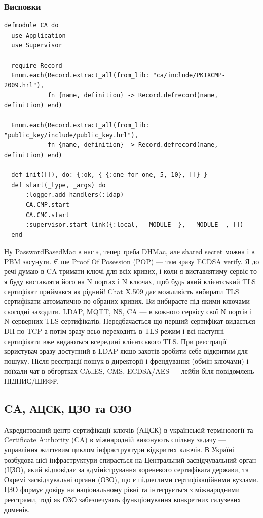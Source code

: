 \newpage
\subsubsection{Висновки}

\begin{lstlisting}
defmodule CA do
  use Application
  use Supervisor

  require Record
  Enum.each(Record.extract_all(from_lib: "ca/include/PKIXCMP-2009.hrl"),
            fn {name, definition} -> Record.defrecord(name, definition) end)

  Enum.each(Record.extract_all(from_lib: "public_key/include/public_key.hrl"),
            fn {name, definition} -> Record.defrecord(name, definition) end)

  def init([]), do: {:ok, { {:one_for_one, 5, 10}, []} }
  def start(_type, _args) do
      :logger.add_handlers(:ldap)
      CA.CMP.start
      CA.CMC.start
      :supervisor.start_link({:local, __MODULE__}, __MODULE__, [])
  end
\end{lstlisting}

Ну PasswordBasedMac в нас є, тепер треба DHMac, але shared secret можна і в PBM засунути. Є ше Proof Of Posession (POP) — там зразу ECDSA verify. Я до речі думаю в CA тримати ключі для всіх кривих, і коли я виставлятиму сервіс то я буду виставляти його на N портах і N ключах, щоб будь який клієнтський TLS сертифікат приймався як рідний! Chat X.509 дає можливість вибирати TLS сертифікати автоматично по обраних кривих. Ви вибираєте під якими ключами сьогодні заходити. LDAP, MQTT, NS, CA — в кожного сервісу свої N портів і N серверних TLS сертифікатів. Передбачається що перший сертифікат видається DH по TCP а потім зразу всьо переходить в TLS режим і всі наступні сертифікати вже видаються всередині клієнтського TLS. При реєстрації користувач зразу доступний в LDAP якшо захотів зробити себе відкритим для пошуку. Після реєстрації пошук в директорії і френдування (обмін ключами) і поїхали чат в обгортках CAdES, CMS, ECDSA/AES — лейби біля повідомлень ПІДПИС/ШИФР.

\subsection{CA, АЦСК, ЦЗО та ОЗО}

Акредитований центр сертифікації ключів (АЦСК) в українській термінології та Certificate Authority (CA) в міжнародній виконують спільну задачу — управління життєвим циклом інфраструктури відкритих ключів. В Україні розбудова цієї інфраструктури спирається на Центральний засвідчувальний орган (ЦЗО), який відповідає за адміністрування кореневого сертифіката держави, та Окремі засвідчувальні органи (ОЗО), що є підлеглими сертифікаційними вузлами. ЦЗО формує довіру на національному рівні та інтегрується з міжнародними реєстрами, тоді як ОЗО забезпечують функціонування конкретних галузевих доменів.

